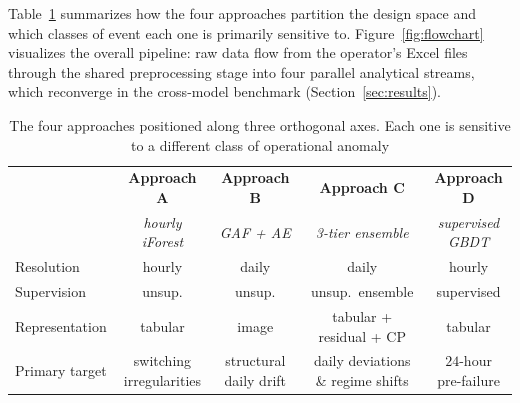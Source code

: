 \documentclass[11pt]{article}
\begin{document}
Table~\ref{tab:four_perspectives} summarizes how the four approaches partition the design space and which classes of event each one is primarily sensitive to. Figure~\ref{fig:flowchart} visualizes the overall pipeline: raw data flow from the operator's Excel files through the shared preprocessing stage into four parallel analytical streams, which reconverge in the cross-model benchmark (Section~\ref{sec:results}).

\begin{table}[H]
\centering
\caption{The four approaches positioned along three orthogonal axes. Each one is sensitive to a different class of operational anomaly}
\label{tab:four_perspectives}
\small
\begin{tabular}{lcccc}
\toprule
& \textbf{Approach A} & \textbf{Approach B} & \textbf{Approach C} & \textbf{Approach D}\\
& \emph{hourly iForest} & \emph{GAF + AE} & \emph{3-tier ensemble} & \emph{supervised GBDT}\\
\midrule
Resolution     & hourly  & daily   & daily   & hourly\\
Supervision    & unsup.  & unsup.  & unsup.\ ensemble & supervised\\
Representation & tabular & image   & tabular + residual + CP & tabular\\
Primary target & switching irregularities & structural daily drift & daily deviations \& regime shifts & $24$-hour pre-failure\\
\bottomrule
\end{tabular}
\end{table}
\end{document}
